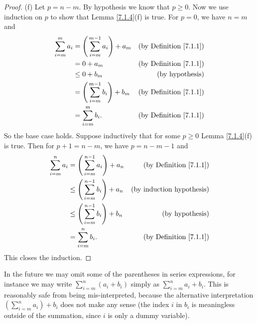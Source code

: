 \begin{proof}{(f)}
    Let \(p = n - m\).
    By hypothesis we know that \(p \geq 0\).
    Now we use induction on \(p\) to show that Lemma \ref{7.1.4}(f) is true.
    For \(p = 0\), we have \(n = m\) and
    \begin{align*}
        \sum_{i = m}^m a_i & = \Bigg(\sum_{i = m}^{m - 1} a_i\Bigg) + a_m & \text{(by Definition \ref{7.1.1})} \\
                           & = 0 + a_m                                    & \text{(by Definition \ref{7.1.1})} \\
                           & \leq 0 + b_m                                 & \text{(by hypothesis)}             \\
                           & = \Bigg(\sum_{i = m}^{m - 1} b_i\Bigg) + b_m & \text{(by Definition \ref{7.1.1})} \\
                           & = \sum_{i = m}^m b_i.                        & \text{(by Definition \ref{7.1.1})} \\
    \end{align*}
    So the base case holds.
    Suppose inductively that for some \(p \geq 0\) Lemma \ref{7.1.4}(f) is true.
    Then for \(p + 1 = n - m\), we have \(p = n - m - 1\) and
    \begin{align*}
        \sum_{i = m}^n a_i & = \Bigg(\sum_{i = m}^{n - 1} a_i\Bigg) + a_n    & \text{(by Definition \ref{7.1.1})} \\
                           & \leq \Bigg(\sum_{i = m}^{n - 1} b_i\Bigg) + a_n & \text{(by induction hypothesis)}   \\
                           & \leq \Bigg(\sum_{i = m}^{n - 1} b_i\Bigg) + b_n & \text{(by hypothesis)}             \\
                           & = \sum_{i = m}^n b_i.                           & \text{(by Definition \ref{7.1.1})} \\
    \end{align*}
    This closes the induction.
\end{proof}

\begin{remark}\label{7.1.5}
    In the future we may omit some of the parentheses in series expressions, for instance we may write \(\sum_{i = m}^n (a_i + b_i)\) simply as \(\sum_{i = m}^n a_i + b_i\).
    This is reasonably safe from being mis-interpreted, because the alternative interpretation \((\sum_{i = m}^n a_i) + b_i\) does not make any sense
    (the index \(i\) in \(b_i\) is meaningless outside of the summation, since \(i\) is only a dummy variable).
\end{remark}

